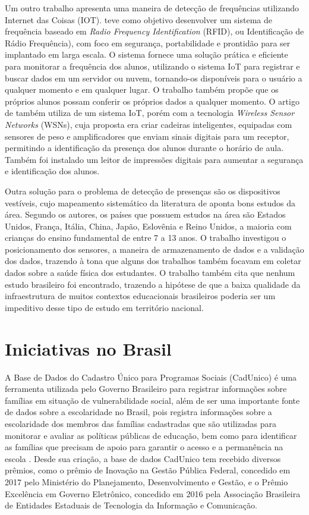 Um outro trabalho apresenta uma maneira de detecção de frequências utilizando Internet das Coisas (IOT).  teve como objetivo desenvolver um sistema de frequência baseado em \textit{Radio Frequency Identification} (RFID), ou Identificação de Rádio Frequência), com foco em segurança, portabilidade e prontidão para ser implantado em larga escala. O sistema fornece uma solução prática e eficiente para monitorar a frequência dos alunos, utilizando o sistema IoT para registrar e buscar dados em um servidor ou nuvem, tornando-os disponíveis para o usuário a qualquer momento e em qualquer lugar. O trabalho também propõe que os próprios alunos possam conferir os próprios dados a qualquer momento. O artigo de  também utiliza de um sistema IoT, porém com a tecnologia \textit{Wireless Sensor Networks} (WSNs), cuja proposta era criar cadeiras inteligentes, equipadas com sensores de peso e amplificadores que enviam sinais digitais para um receptor, permitindo a identificação da presença dos alunos durante o horário de aula. Também foi instalado um leitor de impressões digitais para aumentar a segurança e identificação dos alunos.

Outra solução para o problema de detecção de presenças são os dispositivos vestíveis, cujo mapeamento sistemático da literatura de  aponta bons estudos da área. Segundo os autores, os países que possuem estudos na área são Estados Unidos, França, Itália, China, Japão, Eslovênia e Reino Unidos, a maioria com crianças do ensino fundamental de entre 7 a 13 anos. O trabalho investigou o posicionamento dos sensores, a maneira de armazenamento de dados e a validação dos dados, trazendo à tona que alguns dos trabalhos também focavam em coletar dados sobre a saúde física dos estudantes. O trabalho também cita que nenhum estudo brasileiro foi encontrado, trazendo a hipótese de que a baixa qualidade da infraestrutura de muitos contextos educacionais brasileiros poderia ser um impeditivo desse tipo de estudo em território nacional. 

\section{Iniciativas no Brasil}
\label{sec:brasil}

A Base de Dados do Cadastro Único para Programas Sociais (CadUnico) é uma ferramenta utilizada pelo Governo Brasileiro para registrar informações sobre famílias em situação de vulnerabilidade social, além de ser uma importante fonte de dados sobre a escolaridade no Brasil, pois registra informações sobre a escolaridade dos membros das famílias cadastradas que são utilizadas para monitorar e avaliar as políticas públicas de educação, bem como para identificar as famílias que precisam de apoio para garantir o acesso e a permanência na escola \cite{garcia:2017}. Desde sua criação, a base de dados CadUnico tem recebido diversos prêmios, como o prêmio de Inovação na Gestão Pública Federal, concedido em 2017 pelo Ministério do Planejamento, Desenvolvimento e Gestão, e o Prêmio Excelência em Governo Eletrônico, concedido em 2016 pela Associação Brasileira de Entidades Estaduais de Tecnologia da Informação e Comunicação.

